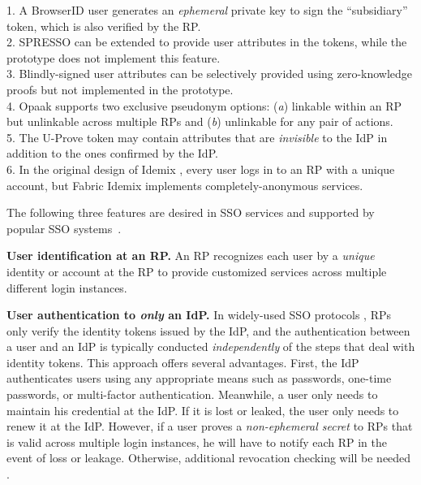 \begin{table}[tb]
\begin{tabular}{|c|c|c|c|c|c|c|}
\end{tabular}
    \label{tbl:comparison-protocol}
\flushleft
{\footnotesize
1. A BrowserID user generates an \emph{ephemeral} private key to sign the ``subsidiary'' token,
 which is also verified by the RP.\\
2. SPRESSO can be extended to provide user attributes in the tokens, while the prototype does not implement this feature.\\
3. Blindly-signed user attributes can be selectively provided using zero-knowledge proofs but not implemented in the prototype.\\
4. Opaak supports two exclusive pseudonym options: (\emph{a}) linkable within an RP but unlinkable across multiple RPs and (\emph{b}) unlinkable for any pair of actions.\\
5. The U-Prove token may contain attributes that are \emph{invisible} to the IdP in addition to the ones confirmed by the IdP. \\
6. In the original design of Idemix \cite{idemix}, every user logs in to an RP with a unique account, but Fabric Idemix implements completely-anonymous services.
}
\end{table}

The following three features are desired in SSO services and supported by popular SSO systems~\cite{NIST2017draft, OpenIDConnect,rfc6749, SAML, SAMLIdentifier}.

\noindent \textbf{User identification at an RP.}
An RP recognizes each user by a \emph{unique} identity or account at the RP to provide customized services across multiple different login instances.

\noindent\textbf{User authentication to {\em only} an IdP.}
In widely-used SSO protocols \cite{OpenIDConnect, rfc6749, SAML}, RPs only verify the identity tokens issued by the IdP, and the authentication between a user and an IdP is typically conducted \emph{independently} of the steps that deal with identity tokens. This approach offers several advantages. First, the IdP authenticates users using any appropriate means such as passwords, one-time passwords, or multi-factor authentication.
Meanwhile, a user only needs to maintain his credential at the IdP.
 If it is lost or leaked, the user only needs to renew it at the IdP.
However, if a user proves a \emph{non-ephemeral secret} to RPs that is valid across multiple login instances, he will have to notify each RP in the event of loss or leakage. Otherwise, additional revocation checking will be needed \cite{ELPASSO, UnlimitID}.

